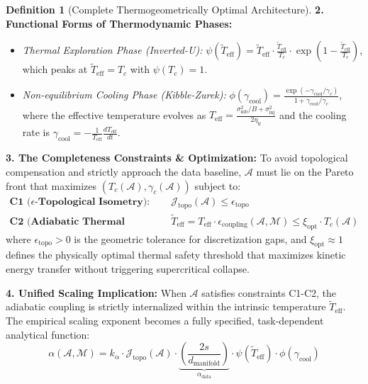 \documentclass[11pt, a4paper]{article}
\theoremstyle{definition}
\newtheorem{definition}{Definition}[section]
\begin{document}
\begin{definition}[Complete Thermogeometrically Optimal Architecture]
\textbf{2. Functional Forms of Thermodynamic Phases:}
\begin{itemize}
 \item \emph{Thermal Exploration Phase (Inverted-U):} $\psi(\tilde{T}_{\text{eff}}) = \tilde{T}_{\text{eff}} \cdot \frac{\tilde{T}_{\text{eff}}}{T_c} \cdot \exp\!\left(1 - \frac{\tilde{T}_{\text{eff}}}{T_c}\right)$, which peaks at $\tilde{T}_{\text{eff}} = T_c$ with $\psi(T_c) = 1$.
 \item \emph{Non-equilibrium Cooling Phase (Kibble-Zurek):} $\phi(\gamma_{\text{cool}}) = \frac{\exp(-\gamma_{\text{cool}}/\gamma_c)}{1 + \gamma_{\text{cool}}/\gamma_c}$, where the effective temperature evolves as $T_{\text{eff}} = \frac{\sigma_{\text{mb}}^2/B + \sigma_{\text{inj}}^2}{2\eta_{\text{lr}}}$ and the cooling rate is $\gamma_{\text{cool}} = -\frac{1}{T_{\text{eff}}}\frac{dT_{\text{eff}}}{dt}$.
\end{itemize}

\textbf{3. The Completeness Constraints \& Optimization:}
To avoid topological compensation and strictly approach the data baseline, $\mathcal{A}$ must lie on the Pareto front that maximizes $(T_c(\mathcal{A}), \gamma_c(\mathcal{A}))$ subject to:
\begin{align}
 \textbf{C1 ($\epsilon$-Topological Isometry):} \quad & \mathcal{J}_{\text{topo}}(\mathcal{A}) \leq \epsilon_{\text{topo}} \label{eq:c1_topo_complete} \\
 \textbf{C2 (Adiabatic Thermal Safety):} \quad & \tilde{T}_{\text{eff}} = T_{\text{eff}} \cdot \epsilon_{\text{coupling}}(\mathcal{A}, \mathcal{M}) \leq \xi_{\text{opt}} \cdot T_c(\mathcal{A}) \label{eq:c2_thermal_complete}
\end{align}
where $\epsilon_{\text{topo}} > 0$ is the geometric tolerance for discretization gaps, and $\xi_{\text{opt}} \approx 1$ defines the physically optimal thermal safety threshold that maximizes kinetic energy transfer without triggering supercritical collapse.

\textbf{4. Unified Scaling Implication:}
When $\mathcal{A}$ satisfies constraints C1-C2, the adiabatic coupling is strictly internalized within the intrinsic temperature $\tilde{T}_{\text{eff}}$. The empirical scaling exponent becomes a fully specified, task-dependent analytical function:
\begin{equation}
 \alpha(\mathcal{A}, \mathcal{M}) = k_\alpha \cdot \mathcal{J}_{\text{topo}}(\mathcal{A}) \cdot \underbrace{\left( \frac{2s}{d_{\text{manifold}}} \right)}_{\alpha_{\text{data}}} \cdot \psi(\tilde{T}_{\text{eff}}) \cdot \phi(\gamma_{\text{cool}})
 \label{eq:complete_scaling_implication}
\end{equation}
\end{definition}
\end{document}
